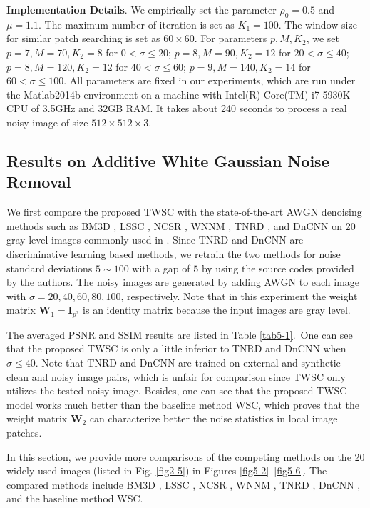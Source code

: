 \textbf{Implementation Details}. We empirically set the parameter $\rho_{0}=0.5$ and $\mu=1.1$. The maximum number of iteration is set as $K_{1}=100$. The window size for similar patch searching is set as $60\times60$. For parameters $p,M,K_{2}$, we set $p=7,M=70,K_{2}=8$ for $0<\sigma\le20$; $p=8,M=90,K_{2}=12$ for $20<\sigma\le40$; $p=8,M=120,K_{2}=12$ for $40<\sigma\le60$; $p=9,M=140,K_{2}=14$ for $60<\sigma\le100$. All parameters are fixed in our experiments, which are run under the Matlab2014b environment on a machine with Intel(R) Core(TM) i7-5930K CPU of 3.5GHz and 32GB RAM. It takes about 240 seconds to process a real noisy image of size $512\times512\times3$.


\subsection{Results on Additive White Gaussian Noise Removal}

We first compare the proposed TWSC with the state-of-the-art AWGN denoising methods such as BM3D \cite{bm3d}, LSSC \cite{lssc}, NCSR \cite{ncsr}, WNNM \cite{wnnm}, TNRD \cite{tnrd}, and DnCNN \cite{dncnn} on 20 gray level images commonly used in \cite{bm3d}. Since TNRD and DnCNN are discriminative learning based methods, we retrain the two methods for noise standard deviations $5\sim100$ with a gap of $5$ by using the source codes provided by the authors. The noisy images are generated by adding AWGN to each image with $\sigma=20,40,60,80,100$, respectively. Note that in this experiment the weight matrix $\bm{W}_{1}=\bm{I}_{p^2}$ is an identity matrix because the input images are gray level.

The averaged PSNR and SSIM \cite{ssim} results are listed in Table \ref{tab5-1}.\ One can see that the proposed TWSC is only a little inferior to TNRD and DnCNN when $\sigma\le40$. Note that TNRD and DnCNN are trained on external and synthetic clean and noisy image pairs, which is unfair for comparison since TWSC only utilizes the tested noisy image. Besides, one can see that the proposed TWSC model works much better than the baseline method WSC, which proves that the weight matrix $\bm{W}_{2}$ can characterize better the noise statistics in local image patches.

In this section, we provide more comparisons of the competing methods on the 20 widely used images (listed in Fig. \ref{fig2-5}) in Figures \ref{fig5-2}--\ref{fig5-6}. The compared methods include BM3D \cite{bm3d}, LSSC \cite{lssc}, NCSR \cite{ncsr}, WNNM \cite{wnnm}, TNRD \cite{tnrd}, DnCNN \cite{dncnn}, and the baseline method WSC.
 
